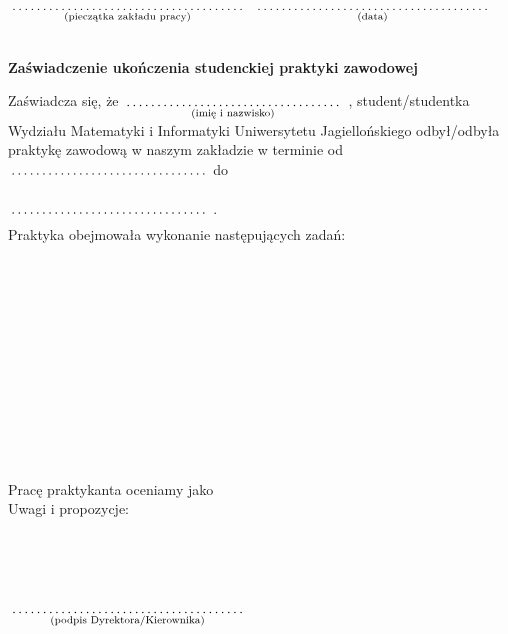 \documentclass[a4paper,11pt]{article}
\newcommand{\fillField}[2]{
    $\underset{\text{#1}}{\parbox[t]{#2}{\dotfill}}$
}
\begin{document}
\noindent
\fillField{(pieczątka zakładu pracy)}{6cm} \hfill \fillField{(data)}{6cm} \\\\

\vskip 1.0cm
\begin{center}
{\Large \textbf{Zaświadczenie ukończenia studenckiej praktyki zawodowej}}
\end{center}
\vskip 0.5cm


\noindent
Zaświadcza się, że \fillField{(imię i nazwisko)}{5.5cm}, student/studentka
Wydziału Matematyki i Informatyki Uniwersytetu Jagiellońskiego odbył/odbyła
praktykę zawodową w naszym zakładzie w terminie od \fillField{}{5cm} do
\fillField{}{5cm}. \\

\noindent
Praktyka obejmowała wykonanie następujących zadań: \\
\phantom{a}\dotfill \\
\phantom{a}\dotfill \\
\phantom{a}\dotfill \\
\phantom{a}\dotfill \\
\phantom{a}\dotfill \\
\phantom{a}\dotfill \\
\phantom{a}\dotfill \\
\phantom{a}\dotfill \\
\phantom{a}\dotfill \\
\phantom{a}\dotfill \\
\phantom{a}\dotfill \\
\phantom{a}\dotfill \\

\noindent
Pracę praktykanta oceniamy jako \dotfill \\

\noindent
Uwagi i propozycje: \dotfill \\
\phantom{a}\dotfill \\
\phantom{a}\dotfill \\
\phantom{a}\dotfill \\
\phantom{a}\dotfill \\
\phantom{a}\dotfill 

\vskip 1.2cm
\hspace{\fill} \fillField{(podpis Dyrektora/Kierownika)}{6cm} \hspace{2.0cm}
\end{document}
